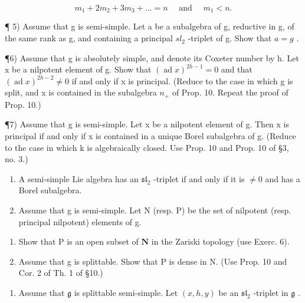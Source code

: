 \[
m _ {1} + 2 m _ {2} + 3 m _ {3} + \dots = n \quad \text { and } \quad m _ {1} <   n.
\]

¶ 5) Assume that g is semi-simple. Let a be a subalgebra of g, reductive in g, of the same rank as g, and containing a principal \(sl_{2}\) -triplet of g. Show that \(a = g\) .

¶6) Assume that g is absolutely simple, and denote its Coxeter number by h. Let x be a nilpotent element of g. Show that \((\operatorname{ad} x)^{2h-1} = 0\) and that \((\operatorname{ad} x)^{2h-2} \neq 0\) if and only if x is principal. (Reduce to the case in which g is split, and x is contained in the subalgebra \(n_{+}\) of Prop. 10. Repeat the proof of Prop. 10.)

¶7) Assume that g is semi-simple. Let x be a nilpotent element of g. Then x is principal if and only if x is contained in a unique Borel subalgebra of g. (Reduce to the case in which k is algebraically closed. Use Prop. 10 and Prop. 10 of §3, no. 3.)

\begin{enumerate}
\def\labelenumi{\arabic{enumi})}
\setcounter{enumi}{7}
\item
  A semi-simple Lie algebra has an \(\mathfrak{sl}_2\) -triplet if and only if it is \(\neq 0\) and has a Borel subalgebra.
\item
  Assume that g is semi-simple. Let N (resp. P) be the set of nilpotent (resp. principal nilpotent) elements of g.
\end{enumerate}

\begin{enumerate}
\def\labelenumi{\alph{enumi})}
\item
  Show that \(\mathrm{P}\) is an open subset of \(\mathbf{N}\) in the Zariski topology (use Exerc. 6).
\item
  Assume that g is splittable. Show that P is dense in N. (Use Prop. 10 and Cor. 2 of Th. 1 of §10.)
\end{enumerate}

\begin{enumerate}
\def\labelenumi{\arabic{enumi})}
\setcounter{enumi}{9}
\tightlist
\item
  Assume that \(\mathfrak{g}\) is splittable semi-simple. Let \((x,h,y)\) be an \(\mathfrak{sl}_2\) -triplet in \(\mathfrak{g}\) .
\end{enumerate}

